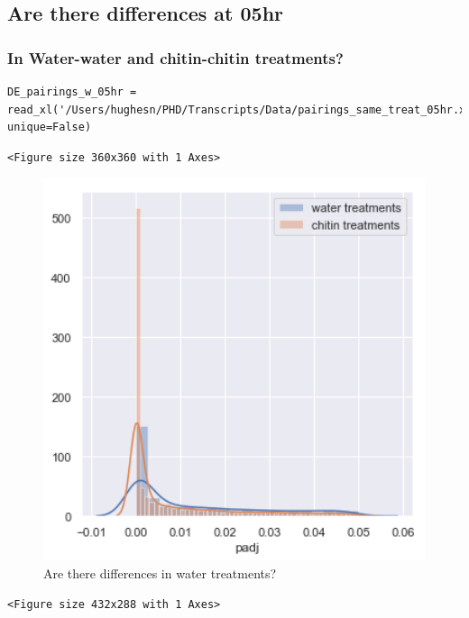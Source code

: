 \documentclass[11pt]{article}
\begin{document}
\subsection{Are there differences at 05hr}
\label{sec:org0cb6667}


\subsubsection{In Water-water and chitin-chitin treatments?}
\label{sec:orga54dd1b}


\begin{verbatim}
DE_pairings_w_05hr = read_xl('/Users/hughesn/PHD/Transcripts/Data/pairings_same_treat_05hr.xlsx', unique=False)
\end{verbatim}

\begin{verbatim}
<Figure size 360x360 with 1 Axes>
\end{verbatim}


\begin{figure}[htbp]
\centering
\includegraphics[width=15cm]{obipy-resources/test_water.png.png}
\caption{\label{test_water.png}
Are there differences in water treatments?}
\end{figure}


\begin{verbatim}
<Figure size 432x288 with 1 Axes>
\end{verbatim}
\end{document}
